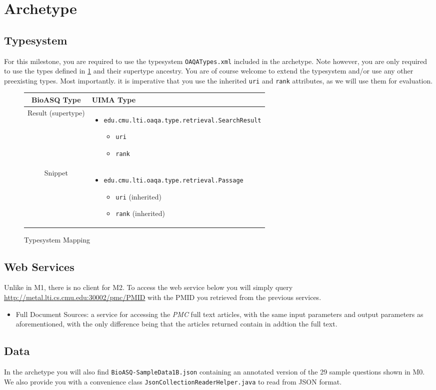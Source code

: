 \section{Archetype}
\subsection{Typesystem}
For this milestone, you are required to use the typesystem \verb|OAQATypes.xml| included in the archetype. Note however, you are only required to use the types defined in \ref{ref:mappings} and their supertype ancestry. You are of course welcome to extend the typesystem and/or use any other preexisting types. Most importantly. it is imperative that you use the inherited \verb|uri| and \verb|rank| attributes, as we will use them for evaluation.
\begin{figure}[h!]
\begin{longtable}{c|P{6cm}}
\textbf{BioASQ Type} & \textbf{UIMA Type}\\\hline
Result (supertype) &   \begin{itemize} \item \verb|edu.cmu.lti.oaqa.type.retrieval.SearchResult| \begin{itemize} \item \verb|uri| \item \verb|rank| \end{itemize} \end{itemize} \\\hline
Snippet & \begin{itemize} \item \verb|edu.cmu.lti.oaqa.type.retrieval.Passage| \begin{itemize} \item \verb|uri| (inherited) \item \verb|rank| (inherited) \end{itemize}  \end{itemize} \\\hline
\end{longtable}
\label{ref:mappings}
\caption{Typesystem Mapping}
\end{figure}
\subsection{Web Services}
\label{subsec:WebServices}
Unlike in M1, there is no client for M2. To access the web service below you will simply query \url{http://metal.lti.cs.cmu.edu:30002/pmc/PMID} with the PMID you retrieved from the previous services.
\begin{itemize}
\item Full Document Sources: a service for accessing the \emph{PMC} full text articles, with the same input parameters and output parameters as aforementioned, with the only difference being that the articles returned contain in addtion the full text.
\end{itemize}
\subsection{Data}
In the archetype you will also find \verb|BioASQ-SampleData1B.json| containing an annotated version of the 29 sample questions shown in M0. We also provide you with a convenience class \verb|JsonCollectionReaderHelper.java| to read from JSON format. 


